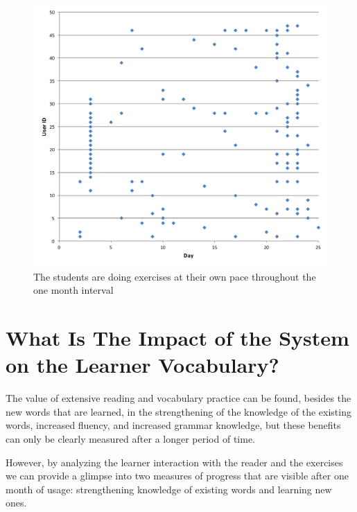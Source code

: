   \begin{figure}[h!]
  \centering
    \includegraphics[width=0.8\columnwidth]{figures/user_exercise_activity_vs_day.pdf}
    \caption{The students are doing exercises at their own pace throughout the one month interval }
    \label{fig:activity_per_day}
  \end{figure}






\newpage
\section{What Is The Impact of the System on the Learner Vocabulary?}

  The value of extensive reading and vocabulary practice can be found, besides the new words that are learned, in the strengthening of the knowledge of the existing words, increased fluency, and increased grammar knowledge, but these benefits can only be clearly measured after a longer period of time\cite{renadya07-power}. 

  However, by analyzing the learner interaction with the reader and the exercises we can provide a glimpse into two measures of progress that are visible after one month of usage: strengthening knowledge of existing words and learning new ones. 

